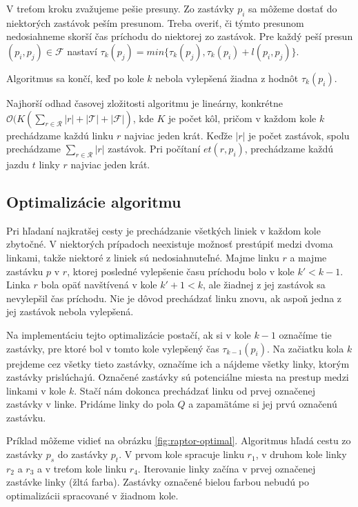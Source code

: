 V treťom kroku zvažujeme pešie presuny. Zo zastávky $p_i$ sa môžeme dostať do niektorých zastávok peším presunom. Treba overiť, či týmto presunom nedosiahneme skorší čas príchodu do niektorej zo zastávok. Pre každý peší presun $(p_i, p_j) \in \mathcal{F}$ nastaví $\tau_k(p_j) = min\{\tau_k(p_j), \tau_k(p_i) + l(p_i, p_j)\}$. 

Algoritmus sa končí, keď po kole $k$ nebola vylepšená žiadna z hodnôt $\tau_k(p_i)$. 

Najhorší odhad časovej zložitosti algoritmu je lineárny, konkrétne $\mathcal{O}(K(\sum_{r \in \mathcal{R}} |r| + |\mathcal{T}| + |\mathcal{F}|)$, kde $K$ je počet kôl, pričom v každom kole $k$ prechádzame každú linku $r$ najviac jeden krát. Keďže $|r|$ je počet zastávok, spolu prechádzame $\sum_{r \in \mathcal{R}} |r|$ zastávok. Pri počítaní $et(r, p_i)$, prechádzame každú jazdu $t$ linky $r$ najviac jeden krát. 

\subsection{Optimalizácie algoritmu}
\label{sub:raptor-optimalisation}
Pri hľadaní najkratšej cesty je prechádzanie všetkých liniek v každom kole zbytočné. V niektorých prípadoch neexistuje možnosť prestúpiť medzi dvoma linkami, takže niektoré z liniek sú nedosiahnuteľné. Majme linku $r$ a majme zastávku $p$ v $r$, ktorej posledné vylepšenie času príchodu bolo v kole $k' < k-1$. Linka $r$ bola opäť navštívená v kole $k'+1 < k$, ale žiadnej z jej zastávok sa nevylepšil čas príchodu. Nie je dôvod prechádzať linku znovu, ak aspoň jedna z jej zastávok nebola vylepšená. 

Na implementáciu tejto optimalizácie postačí, ak si v kole $k-1$ označíme tie zastávky, pre ktoré bol v tomto kole vylepšený čas $\tau_{k-1}(p_i)$. Na začiatku kola $k$ prejdeme cez všetky tieto zastávky, označíme ich a nájdeme všetky linky, ktorým zastávky prislúchajú. Označené zastávky sú potenciálne miesta na prestup medzi linkami v kole $k$. Stačí nám dokonca prechádzať linku od prvej označenej zastávky v linke. Pridáme linky do pola $Q$ a zapamätáme si jej prvú označenú zastávku. 

Príklad môžeme vidieť na obrázku \ref{fig:raptor-optimal}. Algoritmus hľadá cestu zo zastávky $p_s$ do zastávky $p_t$. V prvom kole spracuje linku $r_1$, v druhom kole linky $r_2$ a $r_3$ a v treťom kole linku $r_4$. Iterovanie linky začína v prvej označenej zastávke linky (žltá farba). Zastávky označené bielou farbou nebudú po optimalizácii spracované v žiadnom kole. 

